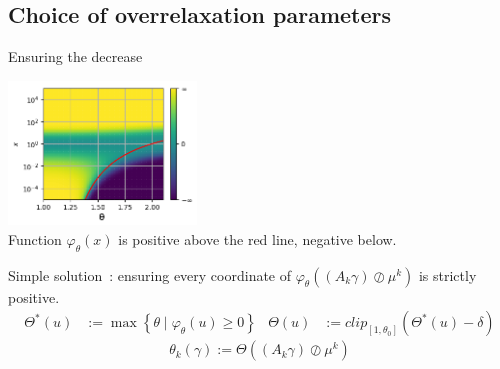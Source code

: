 \documentclass[compress]{beamer}
\begin{document}
\subsection[Choice of OR parameters]{Choice of overrelaxation parameters}
\begin{frame}{Ensuring the decrease}
\begin{center}
	\includegraphics[width=5cm]{images/cvgce_zone_2.png}\\
	Function $\varphi_\theta(x)$ is positive above the red line, negative below.
\end{center}
\pause
Simple solution~: ensuring every coordinate of $\varphi_\theta \left((A_k \gamma) \oslash \mu^k \right)$ is strictly positive.
\pause
\begin{align*}
\Theta^*(u) &:= \max \left\{\theta \mid \varphi_\theta(u) \ge 0 \right\}
&
\Theta(u) &:= clip_{[1,\theta_0]}(\Theta^*(u)-\delta)
\end{align*}
\[
\theta_k (\gamma) := \Theta((A_k \gamma) \oslash \mu^k)
\]
\end{frame}
\end{document}
